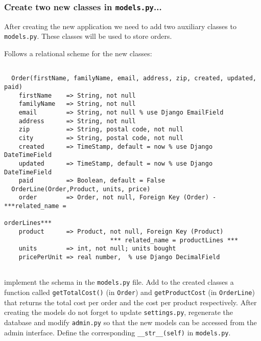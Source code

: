 \documentclass[12pt]{article} %
\newcommand{\ttt}[1]{\texttt{#1}}%
\newcommand{\modelss}{\texttt{models.py}}%
\newcommand{\settings}{\texttt{settings.py}}%
\newcommand{\admin}{\texttt{admin.py}}%
\begin{document}
\subsubsection{Create two new classes in \modelss{}... }
After creating the new application we need to add two auxiliary classes to \modelss{}. These classes will be used to store orders. %


Follows a relational scheme for the new classes:

\begin{verbatim}
  
  Order(firstName, familyName, email, address, zip, created, updated, paid)
    firstName    => String, not null
    familyName   => String, not null
    email        => String, not null % use Django EmailField
    address      => String, not null 
    zip          => String, postal code, not null
    city         => String, postal code, not null
    created      => TimeStamp, default = now % use Django DateTimeField
    updated      => TimeStamp, default = now % use Django DateTimeField
    paid         => Boolean, default = False
  OrderLine(Order,Product, units, price)
    order        => Order, not null, Foreign Key (Order) - ***related_name = 
                                                              orderLines***
    product      => Product, not null, Foreign Key (Product)
                             *** related_name = productLines ***
    units        => int, not null; units bought
    pricePerUnit => real number,  % use Django DecimalField 
      
\end{verbatim}
implement the schema in the \modelss{} file. Add to the created classes a function called \ttt{getTotalCost()} (in \ttt{Order}) and \ttt{getProductCost} (in \ttt{OrderLine}) that returns the total cost per order and the cost per product respectively.
After creating the models do not forget to update \settings{},  regenerate the database and modify \admin{} so that the new models can be accessed from the admin interface. Define the corresponding \ttt{\_\_str\_\_(self)} in \modelss.
\end{document}
